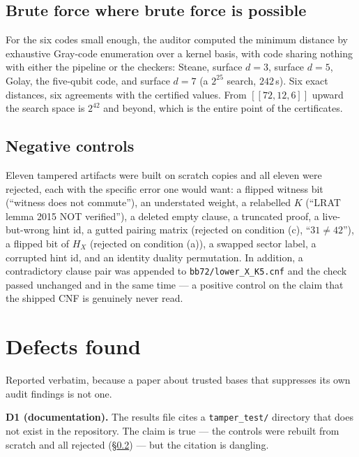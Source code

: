 \documentclass[11pt]{amsart}
\newcommand{\HX}{H_{X}}
\theoremstyle{plain}
\theoremstyle{definition}
\theoremstyle{remark}
\begin{document}
\subsection{Brute force where brute force is possible}\label{ssec:brute}
For the six codes small enough, the auditor computed the minimum distance by
exhaustive Gray-code enumeration over a kernel basis, with code sharing
nothing with either the pipeline or the checkers: Steane, surface $d=3$,
surface $d=5$, Golay, the five-qubit code, and surface $d=7$ (a $2^{25}$
search, $242$\,s). Six exact distances, six agreements with the certified
values. From $[[72,12,6]]$ upward the search space is $2^{42}$ and beyond,
which is the entire point of the certificates.

\subsection{Negative controls}\label{ssec:neg}
Eleven tampered artifacts were built on scratch copies and all eleven were
rejected, each with the specific error one would want: a flipped witness bit
(``witness does not commute''), an understated weight, a relabelled $K$
(``LRAT lemma 2015 NOT verified''), a deleted empty clause, a truncated proof,
a live-but-wrong hint id, a gutted pairing matrix (rejected on condition (c),
``$31\ne42$''), a flipped bit of $\HX$ (rejected on condition (a)), a swapped
sector label, a corrupted hint id, and an identity duality permutation. In
addition, a contradictory clause pair was appended to
\texttt{bb72/lower\_X\_K5.cnf} and the check passed unchanged and in the same
time --- a positive control on the claim that the shipped CNF is genuinely
never read.

\section{Defects found}\label{sec:defects}

Reported verbatim, because a paper about trusted bases that suppresses its own
audit findings is not one.

\smallskip
\noindent\textbf{D1 (documentation).} The results file cites a
\texttt{tamper\_test/} directory that does not exist in the repository. The
claim is true --- the controls were rebuilt from scratch and all rejected
(\S\ref{ssec:neg}) --- but the citation is dangling.
\end{document}
